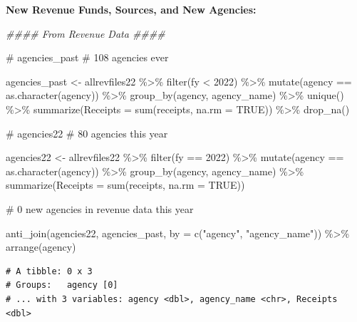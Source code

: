 \documentclass[
  letterpaper,
  DIV=11,
  numbers=noendperiod]{scrreport}
\newenvironment{Shaded}{\begin{snugshade}}{\end{snugshade}}
\newcommand{\AttributeTok}[1]{\textcolor[rgb]{0.40,0.45,0.13}{#1}}
\newcommand{\CommentTok}[1]{\textcolor[rgb]{0.37,0.37,0.37}{#1}}
\newcommand{\ConstantTok}[1]{\textcolor[rgb]{0.56,0.35,0.01}{#1}}
\newcommand{\DecValTok}[1]{\textcolor[rgb]{0.68,0.00,0.00}{#1}}
\newcommand{\DocumentationTok}[1]{\textcolor[rgb]{0.37,0.37,0.37}{\textit{#1}}}
\newcommand{\FunctionTok}[1]{\textcolor[rgb]{0.28,0.35,0.67}{#1}}
\newcommand{\NormalTok}[1]{\textcolor[rgb]{0.00,0.23,0.31}{#1}}
\newcommand{\OtherTok}[1]{\textcolor[rgb]{0.00,0.23,0.31}{#1}}
\newcommand{\SpecialCharTok}[1]{\textcolor[rgb]{0.37,0.37,0.37}{#1}}
\newcommand{\StringTok}[1]{\textcolor[rgb]{0.13,0.47,0.30}{#1}}
\begin{document}
\textbf{New Revenue Funds, Sources, and New Agencies:}

\begin{Shaded}
\begin{Highlighting}[]
\DocumentationTok{\#\#\#\# From Revenue Data \#\#\#\#}

\CommentTok{\# agencies\_past \# 108 agencies ever}

\NormalTok{agencies\_past }\OtherTok{\textless{}{-}}\NormalTok{ allrevfiles22  }\SpecialCharTok{\%\textgreater{}\%} 
  \FunctionTok{filter}\NormalTok{(fy }\SpecialCharTok{\textless{}} \DecValTok{2022}\NormalTok{) }\SpecialCharTok{\%\textgreater{}\%} 
  \FunctionTok{mutate}\NormalTok{(agency }\SpecialCharTok{==} \FunctionTok{as.character}\NormalTok{(agency)) }\SpecialCharTok{\%\textgreater{}\%} 
  \FunctionTok{group\_by}\NormalTok{(agency, agency\_name) }\SpecialCharTok{\%\textgreater{}\%} 
  \FunctionTok{unique}\NormalTok{() }\SpecialCharTok{\%\textgreater{}\%} 
  \FunctionTok{summarize}\NormalTok{(}\AttributeTok{Receipts =} \FunctionTok{sum}\NormalTok{(receipts, }\AttributeTok{na.rm =} \ConstantTok{TRUE}\NormalTok{)) }\SpecialCharTok{\%\textgreater{}\%} 
  \FunctionTok{drop\_na}\NormalTok{()}

\CommentTok{\# agencies22 \# 80 agencies this year}

\NormalTok{agencies22 }\OtherTok{\textless{}{-}}\NormalTok{ allrevfiles22  }\SpecialCharTok{\%\textgreater{}\%} 
  \FunctionTok{filter}\NormalTok{(fy }\SpecialCharTok{==} \DecValTok{2022}\NormalTok{) }\SpecialCharTok{\%\textgreater{}\%} 
  \FunctionTok{mutate}\NormalTok{(agency }\SpecialCharTok{==} \FunctionTok{as.character}\NormalTok{(agency)) }\SpecialCharTok{\%\textgreater{}\%} 
  \FunctionTok{group\_by}\NormalTok{(agency, agency\_name) }\SpecialCharTok{\%\textgreater{}\%} 
  \FunctionTok{summarize}\NormalTok{(}\AttributeTok{Receipts =} \FunctionTok{sum}\NormalTok{(receipts, }\AttributeTok{na.rm =} \ConstantTok{TRUE}\NormalTok{))}

\CommentTok{\# 0 new agencies in revenue data this year}

\FunctionTok{anti\_join}\NormalTok{(agencies22, agencies\_past, }\AttributeTok{by =} \FunctionTok{c}\NormalTok{(}\StringTok{"agency"}\NormalTok{, }\StringTok{"agency\_name"}\NormalTok{)) }\SpecialCharTok{\%\textgreater{}\%} \FunctionTok{arrange}\NormalTok{(agency)}
\end{Highlighting}
\end{Shaded}

\begin{verbatim}
# A tibble: 0 x 3
# Groups:   agency [0]
# ... with 3 variables: agency <dbl>, agency_name <chr>, Receipts <dbl>
\end{verbatim}
\end{document}
